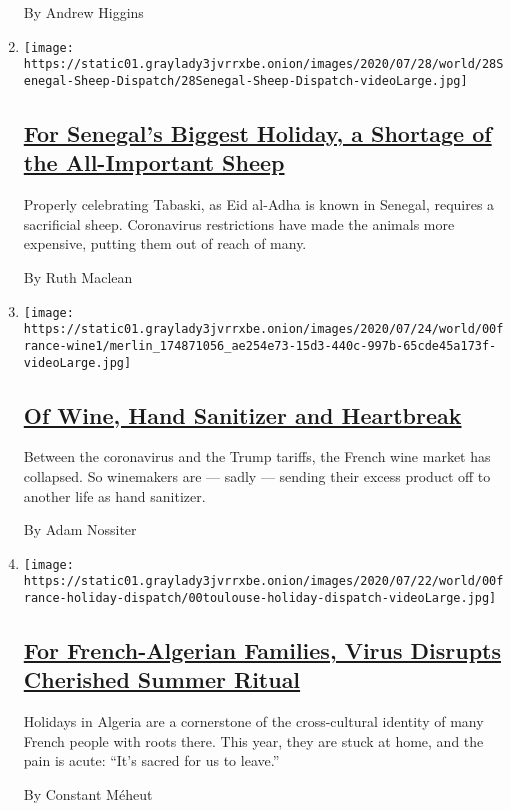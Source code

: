 \begin{enumerate}
  By Andrew Higgins
\item
  \texttt{[image: https://static01.graylady3jvrrxbe.onion/images/2020/07/28/world/28Senegal-Sheep-Dispatch/28Senegal-Sheep-Dispatch-videoLarge.jpg]}

  \hypertarget{for-senegals-biggest-holiday-a-shortage-of-the-all-important-sheep}{%
  \subsection{\texorpdfstring{\href{/2020/07/29/world/africa/senegal-tabaski-sheep-eid-adha.html}{For
  Senegal's Biggest Holiday, a Shortage of the All-Important
  Sheep}}{For Senegal's Biggest Holiday, a Shortage of the All-Important Sheep}}\label{for-senegals-biggest-holiday-a-shortage-of-the-all-important-sheep}}

  Properly celebrating Tabaski, as Eid al-Adha is known in Senegal,
  requires a sacrificial sheep. Coronavirus restrictions have made the
  animals more expensive, putting them out of reach of many.

  By Ruth Maclean
\item
  \texttt{[image: https://static01.graylady3jvrrxbe.onion/images/2020/07/24/world/00france-wine1/merlin\_174871056\_ae254e73-15d3-440c-997b-65cde45a173f-videoLarge.jpg]}

  \hypertarget{of-wine-hand-sanitizer-and-heartbreak}{%
  \subsection{\texorpdfstring{\href{/2020/07/27/world/europe/france-alsace-wine-coronavirus.html}{Of
  Wine, Hand Sanitizer and
  Heartbreak}}{Of Wine, Hand Sanitizer and Heartbreak}}\label{of-wine-hand-sanitizer-and-heartbreak}}

  Between the coronavirus and the Trump tariffs, the French wine market
  has collapsed. So winemakers are --- sadly --- sending their excess
  product off to another life as hand sanitizer.

  By Adam Nossiter
\item
  \texttt{[image: https://static01.graylady3jvrrxbe.onion/images/2020/07/22/world/00france-holiday-dispatch/00toulouse-holiday-dispatch-videoLarge.jpg]}

  \hypertarget{for-french-algerian-families-virus-disrupts-cherished-summer-ritual}{%
  \subsection{\texorpdfstring{\href{/2020/07/26/world/europe/france-algeria-summer-vacations.html}{For
  French-Algerian Families, Virus Disrupts Cherished Summer
  Ritual}}{For French-Algerian Families, Virus Disrupts Cherished Summer Ritual}}\label{for-french-algerian-families-virus-disrupts-cherished-summer-ritual}}

  Holidays in Algeria are a cornerstone of the cross-cultural identity
  of many French people with roots there. This year, they are stuck at
  home, and the pain is acute: ``It's sacred for us to leave.''

  By Constant Méheut
\end{enumerate}


